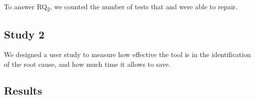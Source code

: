 \noindent
To answer RQ\textsubscript{2}, we counted the number of tests that \tool and \water were able to repair.

\subsection{Study 2}

We designed a user study to measure how effective the tool is in the identification of the root cause, and how much time it allows to save.

\subsection{Results}\label{sec:results}











